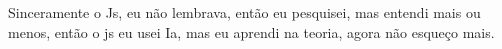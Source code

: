 Sinceramente o Js, eu não lembrava, então eu pesquisei, mas entendi mais ou menos, então o js eu usei Ia, mas eu aprendi na teoria, 
agora não esqueço mais.

